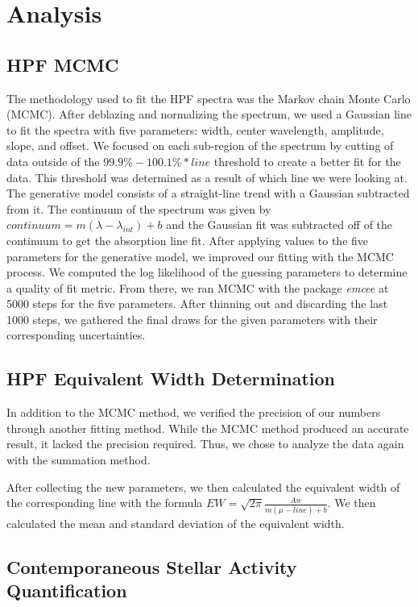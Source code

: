 \documentclass[modern]{aastex631}
\begin{document}
\section{Analysis}
\subsection{HPF MCMC}
The methodology used to fit the HPF spectra was the Markov chain Monte Carlo (MCMC). After deblazing and normalizing the spectrum, we used a Gaussian line to fit the spectra with five parameters: width, center wavelength, amplitude, slope, and offset.  We focused on each sub-region of the spectrum by cutting of data outside of the $99.9\%-100.1\%*line$ threshold to create a better fit for the data. This threshold was determined as a result of which line we were looking at. The generative model consists of a straight-line trend with a Gaussian subtracted from it. The continuum of the spectrum was given by $continuum=m(\lambda-\lambda_{int})+b$ and the Gaussian fit was subtracted off of the continuum to get the absorption line fit. After applying values to the five parameters for the generative model, we improved our fitting with the MCMC process. We computed the log likelihood of the guessing parameters to determine a quality of fit metric. From there, we ran MCMC with the package \textit{emcee} at 5000 steps for the five parameters. After thinning out and discarding the last 1000 steps, we gathered the final draws for the given parameters with their corresponding uncertainties.

\subsection{HPF Equivalent Width Determination}
In addition to the MCMC method, we verified the precision of our numbers through another fitting method. While the MCMC method produced an accurate result, it lacked the precision required. Thus, we chose to analyze the data again with the summation method.

After collecting the new parameters, we then calculated the equivalent width of the corresponding line with the formula $EW=\sqrt{2\pi}\frac{Aw}{m(\mu-line)+b}$. We then calculated the mean and standard deviation of the equivalent width.
\subsection{Contemporaneous Stellar Activity Quantification}
\end{document}
